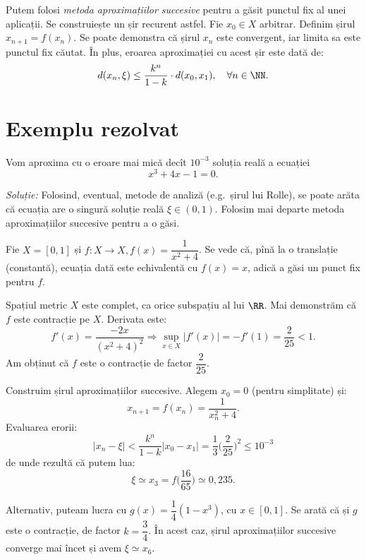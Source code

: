 Putem folosi \emph{metoda aproximațiilor succesive} pentru a găsit punctul
fix al unei aplicații. Se construiește un șir recurent astfel. Fie $ x_0 \in X $
arbitrar. Definim șirul $ x_{n + 1} = f(x_n) $. Se poate demonstra că șirul
$ x_n $ este convergent, iar limita sa este punctul fix căutat. În plus,
eroarea aproximației cu acest șir este dată de:
\[
  d(x_n, \xi) \leq \dfrac{k^n}{1 - k} \cdot d(x_0, x_1), \quad \forall n \in \NN.
\]


\section{Exemplu rezolvat}

Vom aproxima cu o eroare mai mică decît $ 10^{-3} $ soluția reală a
ecuației
\[
  x^3 + 4x - 1 = 0.
\]

\emph{Soluție:} Folosind, eventual, metode de analiză (e.g.\ șirul lui Rolle),
se poate arăta că ecuația are o singură soluție reală $ \xi \in (0, 1) $. Folosim
mai departe metoda aproximațiilor succesive pentru a o găsi.

Fie $ X = [0, 1] $ și $ f : X \to X, f(x) = \dfrac{1}{x^2 + 4} $. Se vede că,
pînă la o translație (constantă), ecuația dată este echivalentă cu $ f(x) = x $,
adică a găsi un punct fix pentru $ f $.

Spațiul metric $ X $ este complet, ca orice subspațiu al lui $ \RR $. Mai
demonstrăm că $ f $ este contracție pe $ X $. Derivata este:
\[
  f'(x) = \frac{-2x}{(x^2 + 4)^2} \Rightarrow %
  \sup_{x \in X}|f'(x)| = -f'(1) = \frac{2}{25} < 1.
\]
Am obținut că $ f $ este o contracție de factor $ \dfrac{2}{25}. $

Construim șirul aproximațiilor succesive. Alegem $ x_0 = 0 $ (pentru simplitate)
și:
\[
  x_{n + 1} = f(x_n) = \dfrac{1}{x_n^2 + 4}.
\]
Evaluarea erorii:
\[
  |x_n - \xi| < \frac{k^n}{1 - k} | x_0 - x_1 | = %
  \frac{1}{3} \Big( \frac{2}{25} \Big)^2 \leq 10^{-3}
\]
de unde rezultă că putem lua:
\[
  \xi \simeq x_3 = f \Big(\frac{16}{65} \Big) \simeq 0,235.
\]

\begin{remark}\label{rk:alt}
  Alternativ, puteam lucra cu $ g(x) = \dfrac{1}{4} (1 - x^3) $, cu $ x\in [0, 1] $.
  Se arată că și $ g $ este o contracție, de factor $ k = \dfrac{3}{4} $. În acest
  caz, șirul aproximațiilor succesive converge mai încet și avem $ \xi \simeq x_6 $.
\end{remark}

